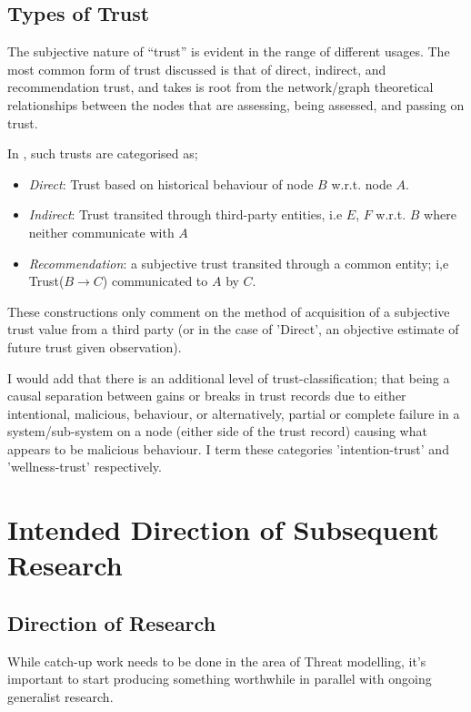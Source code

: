 \documentclass[twoside,10pt,a4paper]{Latex/Classes/PhDthesisPSnPDF}
\begin{document}
\section{Types of Trust}

The subjective nature of ``trust'' is evident in the range of different usages. 
The most common form of trust discussed is that of direct, indirect, and 
recommendation trust, and takes is root from the network/graph theoretical 
relationships between the nodes that are assessing, being assessed, and passing 
on trust.

In \citet{Guo}, such trusts are categorised as;
\begin{itemize}
    \item \emph{Direct}: Trust based on historical behaviour of node $B$ w.r.t.
    node $A$.
    \item \emph{Indirect}: Trust transited through third-party entities, i.e
    $E$, $F$ w.r.t. $B$ where neither communicate with $A$
    \item \emph{Recommendation}: a subjective trust transited through a common
    entity; i,e Trust($B\rightarrow C$) communicated to $A$ by $C$.
\end{itemize}

These constructions only comment on the method of acquisition of a subjective 
trust value from a third party (or in the case of 'Direct', an objective 
estimate of future trust given observation).

I would add that there is an additional level of trust-classification; that 
being a causal separation between gains or breaks in trust records due to 
either intentional, malicious, behaviour, or alternatively, partial or complete 
failure in a system/sub-system on a node (either side of the trust record) 
causing what appears to be malicious behaviour. I term these categories 
'intention-trust' and 'wellness-trust' respectively.

\chapter{Intended Direction of Subsequent Research}
\section{Direction of Research}
While catch-up work needs to be done in the area of Threat modelling, it's
important to start producing something worthwhile in parallel with ongoing
generalist research. 
\end{document}
